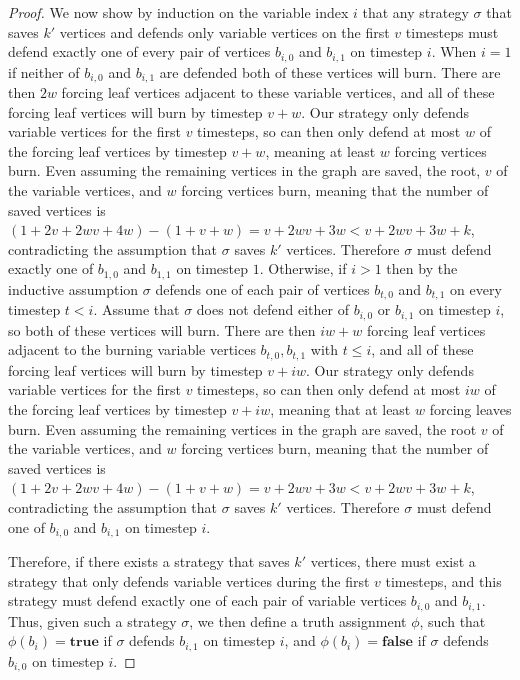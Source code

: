 \documentclass[a4paper,UKenglish,cleveref, autoref, thm-restate]{lipics-v2021} %
\begin{document}
\begin{toappendix}
\begin{proof}
We now show by induction on the variable index $i$ that any strategy $\sigma$ that saves $k'$ vertices and defends only variable vertices on the first $v$ timesteps must defend exactly one of every pair of vertices $b_{i,0}$ and $b_{i,1}$ on timestep $i$. When $i = 1$ if neither of $b_{i,0}$ and $b_{i,1}$ are defended both of these vertices will burn. There are then $2w$ forcing leaf vertices adjacent to these variable vertices, and all of these forcing leaf vertices will burn by timestep $v+w$. Our strategy only defends variable vertices for the first $v$ timesteps, so can then only defend at most $w$ of the forcing leaf vertices by timestep $v+w$, meaning at least $w$ forcing vertices burn. Even assuming the remaining vertices in the graph are saved, the root, $v$ of the variable vertices, and $w$ forcing vertices burn, meaning that the number of saved vertices is $(1+2v+2wv+4w)-(1+v+w)=v+2wv+3w < v+2wv+3w+k$, contradicting the assumption that $\sigma$ saves $k'$ vertices. Therefore $\sigma$ must defend exactly one of $b_{1,0}$ and $b_{1,1}$ on timestep $1$. Otherwise, if $i > 1$ then by the inductive assumption $\sigma$ defends one of each pair of vertices $b_{t,0}$ and $b_{t,1}$ on every timestep $t < i$. Assume that $\sigma$ does not defend either of $b_{i,0}$ or $b_{i,1}$ on timestep $i$, so both of these vertices will burn. There are then $iw+w$ forcing leaf vertices adjacent to the burning variable vertices $b_{t,0}, b_{t,1}$ with $t \leq i$, and all of these forcing leaf vertices will burn by timestep $v+iw$. Our strategy only defends variable vertices for the first $v$ timesteps, so can then only defend at most $iw$ of the forcing leaf vertices by timestep $v+iw$, meaning that at least $w$ forcing leaves burn. Even assuming the remaining vertices in the graph are saved, the root $v$ of the variable vertices, and $w$ forcing vertices burn, meaning that the number of saved vertices is $(1+2v+2wv+4w)-(1+v+w)=v+2wv+3w < v+2wv+3w+k$, contradicting the assumption that $\sigma$ saves $k'$ vertices. Therefore $\sigma$ must defend one of $b_{i,0}$ and $b_{i,1}$ on timestep $i$.

Therefore, if there exists a strategy that saves $k'$ vertices, there must exist a strategy that only defends variable vertices during the first $v$ timesteps, and this strategy must defend exactly one of each pair of variable vertices $b_{i,0}$ and $b_{i,1}$. Thus, given such a strategy $\sigma$, we then define a truth assignment $\phi$, such that $\phi(b_i)=\textbf{true}$ if $\sigma$ defends $b_{i,1}$ on timestep $i$, and $\phi(b_i)=\textbf{false}$ if $\sigma$ defends $b_{i,0}$ on timestep $i$.


\end{proof}
\end{toappendix}
\end{document}
